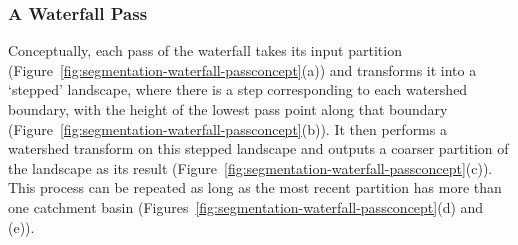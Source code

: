 \subsubsection{A Waterfall Pass}

Conceptually, each pass of the waterfall takes its input partition (Figure~\ref{fig:segmentation-waterfall-passconcept}(a)) and transforms it into a `stepped' landscape, where there is a step corresponding to each watershed boundary, with the height of the lowest pass point along that boundary (Figure~\ref{fig:segmentation-waterfall-passconcept}(b)). It then performs a watershed transform on this stepped landscape and outputs a coarser partition of the landscape as its result (Figure~\ref{fig:segmentation-waterfall-passconcept}(c)). This process can be repeated as long as the most recent partition has more than one catchment basin (Figures~\ref{fig:segmentation-waterfall-passconcept}(d) and (e)).

